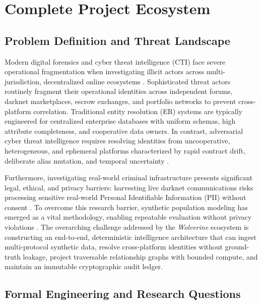 \chapter{Complete Project Ecosystem}
\label{ch:complete-project-ecosystem}

\section{Problem Definition and Threat Landscape}
\label{sec:problem}

Modern digital forensics and cyber threat intelligence (CTI) face severe operational fragmentation when investigating illicit actors across multi-jurisdiction, decentralized online ecosystems \cite{liao2016acing, soska2015measuring}. Sophisticated threat actors routinely fragment their operational identities across independent forums, darknet marketplaces, escrow exchanges, and portfolio networks to prevent cross-platform correlation. Traditional entity resolution (ER) systems \cite{fellegi1969theory, getoor2012entity} are typically engineered for centralized enterprise databases with uniform schemas, high attribute completeness, and cooperative data owners. In contrast, adversarial cyber threat intelligence requires resolving identities from uncooperative, heterogeneous, and ephemeral platforms characterized by rapid contract drift, deliberate alias mutation, and temporal uncertainty \cite{narayanan2008robust, elmagarmid2007duplicate}.

Furthermore, investigating real-world criminal infrastructure presents significant legal, ethical, and privacy barriers: harvesting live darknet communications risks processing sensitive real-world Personal Identifiable Information (PII) without consent \cite{dwork2006differential}. To overcome this research barrier, synthetic population modeling has emerged as a vital methodology, enabling repeatable evaluation without privacy violations \cite{nowok2016synthpop}. The overarching challenge addressed by the \textit{Wolverine} ecosystem is constructing an end-to-end, deterministic intelligence architecture that can ingest multi-protocol synthetic data, resolve cross-platform identities without ground-truth leakage, project traversable relationship graphs with bounded compute, and maintain an immutable cryptographic audit ledger.

\section{Formal Engineering and Research Questions}
\label{sec:research_questions}

